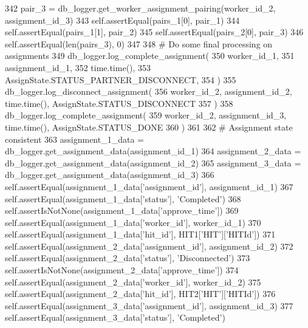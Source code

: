 \begin{DoxyCode}
342         pair\_3 = db\_logger.get\_worker\_assignment\_pairing(worker\_id\_2, assignment\_id\_3)
343         self.assertEqual(pairs\_1[0], pair\_1)
344         self.assertEqual(pairs\_1[1], pair\_2)
345         self.assertEqual(pairs\_2[0], pair\_3)
346         self.assertEqual(len(pairs\_3), 0)
347 
348         \textcolor{comment}{# Do some final processing on assignments}
349         db\_logger.log\_complete\_assignment(
350             worker\_id\_1,
351             assignment\_id\_1,
352             time.time(),
353             AssignState.STATUS\_PARTNER\_DISCONNECT,
354         )
355         db\_logger.log\_disconnect\_assignment(
356             worker\_id\_2, assignment\_id\_2, time.time(), AssignState.STATUS\_DISCONNECT
357         )
358         db\_logger.log\_complete\_assignment(
359             worker\_id\_2, assignment\_id\_3, time.time(), AssignState.STATUS\_DONE
360         )
361 
362         \textcolor{comment}{# Assignment state consistent}
363         assignment\_1\_data = db\_logger.get\_assignment\_data(assignment\_id\_1)
364         assignment\_2\_data = db\_logger.get\_assignment\_data(assignment\_id\_2)
365         assignment\_3\_data = db\_logger.get\_assignment\_data(assignment\_id\_3)
366         self.assertEqual(assignment\_1\_data[\textcolor{stringliteral}{'assignment\_id'}], assignment\_id\_1)
367         self.assertEqual(assignment\_1\_data[\textcolor{stringliteral}{'status'}], \textcolor{stringliteral}{'Completed'})
368         self.assertIsNotNone(assignment\_1\_data[\textcolor{stringliteral}{'approve\_time'}])
369         self.assertEqual(assignment\_1\_data[\textcolor{stringliteral}{'worker\_id'}], worker\_id\_1)
370         self.assertEqual(assignment\_1\_data[\textcolor{stringliteral}{'hit\_id'}], HIT1[\textcolor{stringliteral}{'HIT'}][\textcolor{stringliteral}{'HITId'}])
371         self.assertEqual(assignment\_2\_data[\textcolor{stringliteral}{'assignment\_id'}], assignment\_id\_2)
372         self.assertEqual(assignment\_2\_data[\textcolor{stringliteral}{'status'}], \textcolor{stringliteral}{'Disconnected'})
373         self.assertIsNotNone(assignment\_2\_data[\textcolor{stringliteral}{'approve\_time'}])
374         self.assertEqual(assignment\_2\_data[\textcolor{stringliteral}{'worker\_id'}], worker\_id\_2)
375         self.assertEqual(assignment\_2\_data[\textcolor{stringliteral}{'hit\_id'}], HIT2[\textcolor{stringliteral}{'HIT'}][\textcolor{stringliteral}{'HITId'}])
376         self.assertEqual(assignment\_3\_data[\textcolor{stringliteral}{'assignment\_id'}], assignment\_id\_3)
377         self.assertEqual(assignment\_3\_data[\textcolor{stringliteral}{'status'}], \textcolor{stringliteral}{'Completed'})

\end{DoxyCode}
